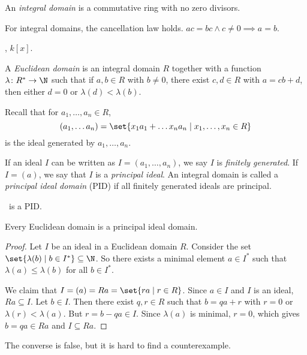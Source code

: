 \begin{definition} \label{def:ring:integral_domain}
    An \emph{integral domain} is a commutative ring with no zero divisors.
\end{definition}
For integral domains, the cancellation law holds.
$ac = bc \land c \ne 0 \implies a = b$.
\begin{example}
    \Z, $k[x]$.
\end{example}

\begin{definition*} \label{def:ring:euclidean_domain}
    A \emph{Euclidean domain} is an integral domain $R$ together with
    a function $\lambda\colon R^* \to \N$ such that if
    $a, b \in R$ with $b \ne 0$, there exist $c, d \in R$ with
    $a = cb + d$, then either $d = 0$ or $\lambda(d) < \lambda(b)$.
\end{definition*}

Recall that for $a_1, \dots, a_n \in R$, \[
    (a_1, \dots a_n)
        = \set{x_1 a_1 + \dots x_n a_n \mid x_1, \dots, x_n \in R}
\] is the ideal generated by $a_1, \dots, a_n$.
\begin{definition*} \label{def:principal_ideals}
    If an ideal $I$ can be written as $I = (a_1, \dots, a_n)$, we say $I$ is
    \emph{finitely generated}.
    If $I = (a)$, we say that $I$ is a \emph{principal ideal}.
    An integral domain is called a \emph{principal ideal domain} (PID)
    if all finitely generated ideals are principal.
\end{definition*}
\begin{example}
    \Z\ is a PID.
\end{example}

\begin{proposition*}
    Every Euclidean domain is a principal ideal domain.
\end{proposition*}
\begin{proof}
    Let $I$ be an ideal in a Euclidean domain $R$.
    Consider the set $\set{\lambda(b) \mid b \in I^*} \subseteq \N$.
    So there exists a minimal element $a \in I^*$ such that
    $\lambda(a) \le \lambda(b)$ for all $b \in I^*$.

    We claim that $I = (a) = Ra = \set{ra \mid r \in R}$.
    Since $a \in I$ and $I$ is an ideal, $Ra \subseteq I$.
    Let $b \in I$.
    Then there exist $q, r \in R$ such that $b = qa + r$ with $r = 0$ or
    $\lambda(r) < \lambda(a)$.
    But $r = b - qa \in I$.
    Since $\lambda(a)$ is minimal, $r = 0$, which gives $b = qa \in Ra$
    and $I \subseteq Ra$.
\end{proof}
The converse is false, but it is hard to find a counterexample.

